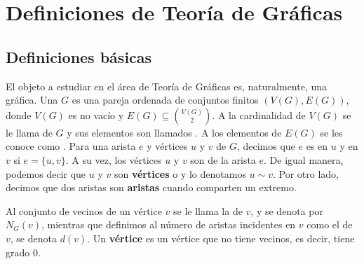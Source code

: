 \chapter{Definiciones de Teor\'ia de Gr\'aficas}%
\label{cap:defs grafs}

\section{Definiciones b\'asicas}%
\label{sec:def-basicas}

El objeto a estudiar en el \'area de Teor\'ia de Gr\'aficas es, naturalmente,
una gr\'afica. Una  $G$ es una pareja ordenada de conjuntos
finitos $(V(G), E(G))$, donde $V(G)$ es no vac\'io y $E(G) \subseteq
\binom{V(G)}{2}$. A la cardinalidad de $V(G)$ se le llama
 de $G$ y sus elementos son llamados
. A los elementos de $E(G)$ se les conoce como
. Para una arista $e$ y v\'ertices $u$ y $v$ de $G$, decimos que
$e$ es  en $u$ y en $v$ si $e= \{u, v\}$. A su
vez, los v\'ertices $u$ y $v$ son  de la arista
$e$. De igual manera, podemos decir que $u$ y $v$ son \textbf{v\'ertices}
 o
 y lo denotamos $u \sim v$. Por otro lado,
decimos que dos aristas son \textbf{aristas}
 cuando comparten un
extremo. 

Al conjunto de vecinos de un v\'ertice $v$ se le llama la  de
$v$, y se denota por $N_G(v)$, mientras que definimos al n\'umero de aristas
incidentes en $v$ como el  de $v$, se denota $d(v)$. Un
\textbf{v\'ertice}  es  un v\'ertice que no tiene
vecinos, es decir, tiene grado $0$.

